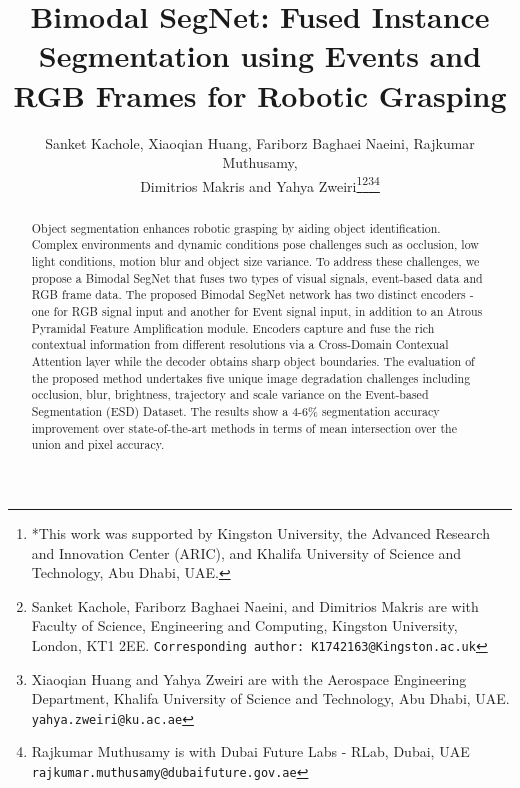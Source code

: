 \documentclass[lettersize,journal]{IEEEtran}
\begin{document}
\title{Bimodal SegNet: Fused Instance Segmentation using Events and RGB Frames for Robotic Grasping}





\author{Sanket Kachole, Xiaoqian Huang, Fariborz Baghaei Naeini, Rajkumar Muthusamy, \\ Dimitrios Makris and Yahya Zweiri\thanks{*This work was supported by Kingston University, the Advanced Research and Innovation Center (ARIC), and Khalifa University of Science and Technology, Abu Dhabi, UAE.}\thanks{Sanket Kachole, Fariborz Baghaei Naeini, and Dimitrios Makris are with Faculty of Science, Engineering and Computing, Kingston University, London, KT1 2EE.
        {\tt\small Corresponding author: K1742163@Kingston.ac.uk}}\thanks{Xiaoqian Huang and Yahya Zweiri are with the Aerospace Engineering Department, Khalifa University of Science and Technology, Abu Dhabi, UAE.
        {\tt\small yahya.zweiri@ku.ac.ae}}\thanks{Rajkumar Muthusamy is with Dubai Future Labs - RLab, Dubai, UAE
        {\tt\small rajkumar.muthusamy@dubaifuture.gov.ae}}}













\maketitle



\begin{abstract}



Object segmentation enhances robotic grasping by aiding object identification. Complex environments and dynamic conditions pose challenges such as occlusion, low light conditions, motion blur and object size variance. To address these challenges, we propose a Bimodal SegNet that fuses two types of visual signals, event-based data and RGB  frame data. The proposed Bimodal SegNet network has two distinct encoders - one for RGB signal input and another for Event signal input, in addition to an Atrous Pyramidal Feature Amplification module. Encoders capture and fuse the rich contextual information from different resolutions via a Cross-Domain Contexual Attention layer while the decoder obtains sharp object boundaries. The evaluation of the proposed method undertakes five unique image degradation challenges including occlusion, blur, brightness, trajectory and scale variance on the Event-based Segmentation (ESD) Dataset. The results show a 4-6\% segmentation accuracy improvement over state-of-the-art methods in terms of mean intersection over the union and pixel accuracy.

 
 
\end{abstract}
\end{document}
